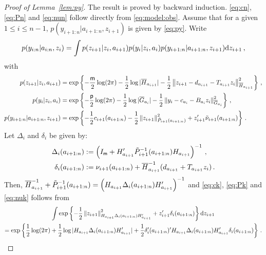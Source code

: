 \begin{proof}[Proof of Lemma~\ref{lem:py}]
The result is proved by backward induction. \eqref{eq:cn}, \eqref{eq:Pn} and \eqref{eq:nun} follow directly from \eqref{eq:model:obs}. Assume that for a given $1\le i\le n-1$, $p(y_{i+1:n}|a_{i+1:n},z_{i+1})$ is given by \eqref{eq:py}. Write
\[
p(y_{i:n}|a_{i:n},z_i) = \int p(z_{i+1}|z_i,a_{i+1})p(y_i|z_i,a_i)p(y_{i+1:n}|a_{i+1:n},z_{i+1})\rmd z_{i+1}\eqsp,
\]
with
\begin{align*}
p(z_{i+1}|z_i,a_{i+1}) &= \exp\left\{-\frac{\dimz}{2}\log(2\pi)-\frac{1}{2}\log|\barH_{a_{i+1}}|-\frac{1}{2}\normMat{\barH_{a_{i+1}}}{z_{i+1}-d_{a_{i+1}}-T_{a_{i+1}}z_i}^2\right\}\eqsp,\\
p(y_i|z_i,a_i)& = \exp\left\{-\frac{\dimy}{2}\log(2\pi)-\frac{1}{2}\log|\barG_{a_i}|-\frac{1}{2}\normMat{\barG_{a_i}}{y_{i}-c_{a_{i}}-B_{a_i}z_i}^2\right\}\eqsp,\\
p(y_{i+1:n}|a_{i+1:n},z_{i+1})& = \exp\left\{-\frac{1}{2}c_{i+1}(a_{i+1:n}) - \frac{1}{2}\normMat{\tilde{P}_{i+1}(a_{i+1:n})}{z_{i+1}}^2 + z'_{i+1}\tilde{\nu}_{i+1}(a_{i+1:n})\right\}\eqsp.
\end{align*}
Let $\Delta_{i}$ and  $\delta_{i}$ be given by:
\begin{align*}
\Delta_{i}(a_{i+1:n}) &\eqdef \left(I_{\dimz} + H'_{a_{i+1}}\tilde{P}_{i+1}^{-1}(a_{i+1:n})H_{a_{i+1}}\right)^{-1}\eqsp,\\
\delta_{i}(a_{i+1:n}) &\eqdef \nu_{i+1}(a_{i+1:n}) + \barH_{a_{i+1}}^{-1}(d_{a_{i+1}}+T_{a_{i+1}}z_i)\eqsp.
\end{align*}
Then, $\barH_{a_{i+1}}^{-1} + \tilde{P}_{i+1}^{-1}(a_{i+1:n}) = \left(H_{a_{i+1}}\Delta_{i}(a_{i+1:n})H'_{a_{i+1}}\right)^{-1}$ and \eqref{eq:ck}, \eqref{eq:Pk} and \eqref{eq:nuk} follows from
\begin{multline*}
\int \exp\left\{-\frac{1}{2}\normMat{H_{a_{i+1}}\Delta_{i}(a_{i+1:n})H'_{a_{i+1}}}{z_{i+1}}^2 + z'_{i+1}\delta_{i}(a_{i+1:n})\right\}\rmd z_{i+1}\\
 =\exp\left\{\frac{1}{2}\log(2\pi) + \frac{1}{2}\log|H_{a_{i+1}}\Delta_{i}(a_{i+1:n})H'_{a_{i+1}}|+\frac{1}{2}\delta'_{i}(a_{i+1:n})'H_{a_{i+1}}\Delta_{i}(a_{i+1:n})H'_{a_{i+1}}\delta_{i}(a_{i+1:n})\right\}\eqsp.
\end{multline*}
\end{proof}

